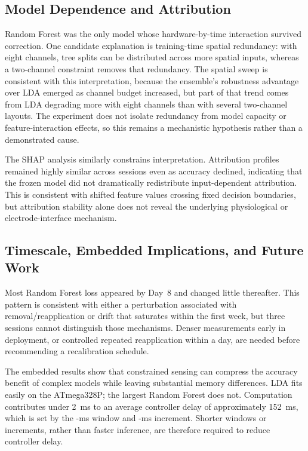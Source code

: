 \documentclass[preprint,12pt]{elsarticle}
\begin{document}
\subsection{Model Dependence and Attribution}
Random Forest was the only model whose hardware-by-time interaction survived correction. One candidate explanation is training-time spatial redundancy: with eight channels, tree splits can be distributed across more spatial inputs, whereas a two-channel constraint removes that redundancy. The spatial sweep is consistent with this interpretation, because the ensemble's robustness advantage over LDA emerged as channel budget increased, but part of that trend comes from LDA degrading more with eight channels than with several two-channel layouts. The experiment does not isolate redundancy from model capacity or feature-interaction effects, so this remains a mechanistic hypothesis rather than a demonstrated cause.

The SHAP analysis similarly constrains interpretation. Attribution profiles remained highly similar across sessions even as accuracy declined, indicating that the frozen model did not dramatically redistribute input-dependent attribution. This is consistent with shifted feature values crossing fixed decision boundaries, but attribution stability alone does not reveal the underlying physiological or electrode-interface mechanism.

\subsection{Timescale, Embedded Implications, and Future Work}
Most Random Forest loss appeared by Day~8 and changed little thereafter. This pattern is consistent with either a perturbation associated with removal/reapplication or drift that saturates within the first week, but three sessions cannot distinguish those mechanisms. Denser measurements early in deployment, or controlled repeated reapplication within a day, are needed before recommending a recalibration schedule.

The embedded results show that constrained sensing can compress the accuracy benefit of complex models while leaving substantial memory differences. LDA fits easily on the ATmega328P; the largest Random Forest does not. Computation contributes under 2~ms to an average controller delay of approximately 152~ms, which is set by the \windowMs{}-ms window and \stepMs{}-ms increment. Shorter windows or increments, rather than faster inference, are therefore required to reduce controller delay.
\end{document}
